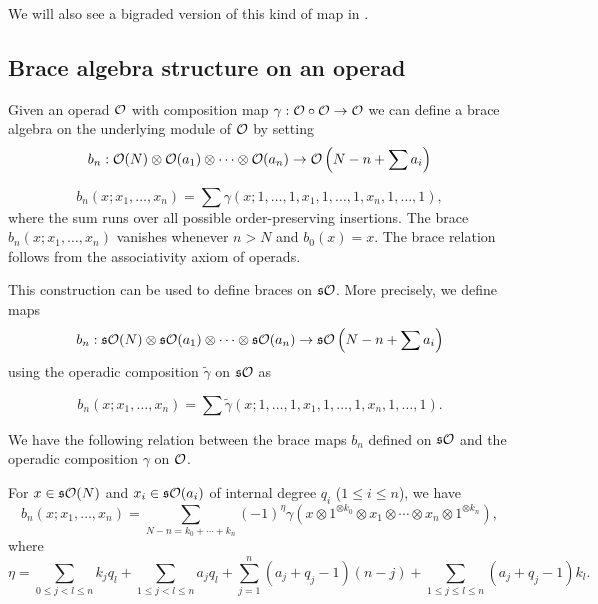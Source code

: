 \documentclass[Thesis.tex]{subfiles}
\begin{document}
We will also see a bigraded version of this kind of map in .
\subsection{Brace algebra structure on an operad}


Given an operad ${\mathcal O}$ with composition map $\gamma:{\mathcal O}\circ{\mathcal O}\to{\mathcal O}$ we can define a brace algebra on the underlying module of ${\mathcal O}$ by setting
\[b_n:{\mathcal O}(N)\otimes{\mathcal O}(a_1)\otimes\cdots\otimes{\mathcal O}(a_n)\to{\mathcal O}\left(N-n+\sum a_i\right)\]

\[b_n(x;x_1,\dots, x_n)=\sum\gamma(x;1,\dots,1,x_1,1,\dots,1,x_n,1,\dots,1),\]
where the sum runs over all possible order-preserving insertions. The brace $b_n(x;x_1,\dots,x_n)$ vanishes whenever $n>N$ and $b_0(x)=x$. The brace relation follows from the associativity axiom of operads.


This construction can  be used to define braces on $\mathfrak{s}{\mathcal O}$. More precisely, we define maps 
\[b_n:\mathfrak{s}{\mathcal O}(N)\otimes\mathfrak{s}{\mathcal O}(a_1)\otimes\cdots\otimes\mathfrak{s}{\mathcal O}(a_n)\to\mathfrak{s}{\mathcal O}\left(N-n+\sum a_i\right)\]
using the operadic composition $\tilde{\gamma}$ on $\mathfrak{s}{\mathcal O}$ as

\[b_n(x;x_1,\dots,x_n)=\sum\tilde{\gamma}(x;1,\dots,1,x_1,1,\dots,1,x_n,1,\dots,1).\]

We have the following relation between the brace maps $b_n$ defined on $\mathfrak{s}{\mathcal O}$ and the operadic composition $\gamma$ on ${\mathcal O}$. 
\begin{propo}\label{bracesign}
For $x\in \mathfrak{s}{\mathcal O}(N)$ and $x_i\in\mathfrak{s}{\mathcal O}(a_i)$ of internal degree $q_i$ ($1\leq i\leq n$), we have
\[b_n(x;x_1,\dots,x_n)=\sum_{N-n=k_0+\cdots+k_n} (-1)^\eta \gamma
(x\otimes 1^{\otimes k_0}\otimes x_1\otimes \cdots\otimes x_n\otimes1^{\otimes k_n}),\]
where 
\[\eta=\sum_{0\leq j<l\leq n}k_jq_l+\sum_{1\leq j<l\leq n}a_jq_l+\sum_{j=1}^n (a_j+q_j-1)(n-j)+\sum_{1\leq j\leq l\leq n} (a_j+q_j-1)k_l.\]
\end{propo}
\end{document}

